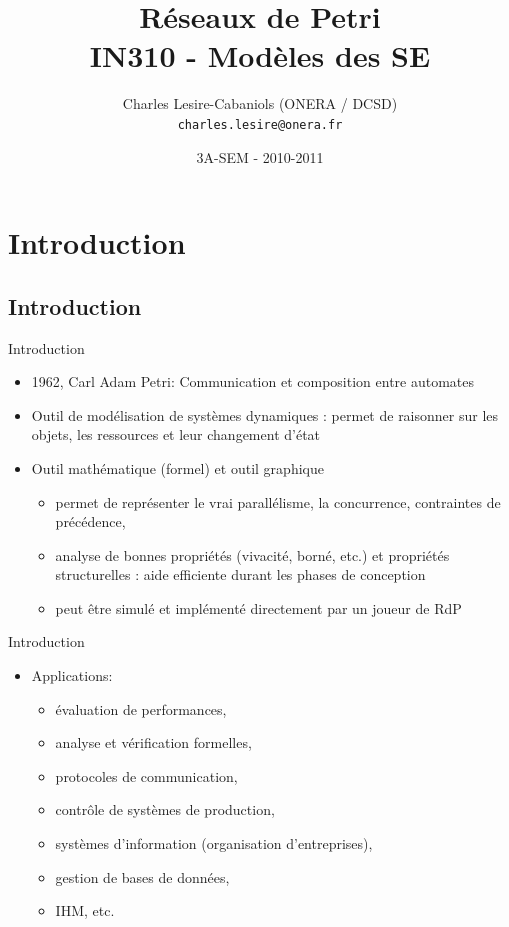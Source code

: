 \documentclass[compress]{beamer}
\title[SEM IN310 - Réseaux de Petri]{Réseaux de Petri\\IN310 - Modèles des SE}
\author[Charles Lesire]{Charles Lesire-Cabaniols (ONERA / DCSD)\\{\tt charles.lesire@onera.fr}}
\date[2010-2011]{3A-SEM - 2010-2011}
\begin{document}
\begin{frame}
\titlepage
\end{frame}

\begin{frame}
\tableofcontents[hidesubsections]
\end{frame}

\section{Introduction}
\begin{frame}
\tableofcontents[hideothersubsections]
\end{frame}

\subsection{Introduction}
\begin{frame}{Introduction}
\begin{itemize}
\item 1962, Carl Adam Petri: Communication et composition entre automates
\item Outil de modélisation de systèmes dynamiques : permet de raisonner sur les objets, les ressources et leur changement d'état
\item Outil mathématique (formel) et outil graphique
	\begin{itemize}
	\item permet de représenter le vrai parallélisme, la concurrence, contraintes de précédence,
	\item analyse de bonnes propriétés (vivacité, borné, etc.) et propriétés structurelles : aide efficiente durant les phases de conception
	\item peut être simulé et implémenté directement par un joueur de RdP
	\end{itemize} 
\end{itemize} 
\end{frame}

\begin{frame}{Introduction}
\begin{itemize}
\item Applications:
	\begin{itemize}
	\item évaluation de performances, 
	\item analyse et vérification formelles, 
	\item protocoles de communication, 
	\item contrôle de systèmes de production, 
	\item systèmes d'information (organisation d'entreprises), 
	\item gestion de bases de données, 
	\item IHM, etc.
	\end{itemize} 
\end{itemize} 
\end{frame}
\end{document}
